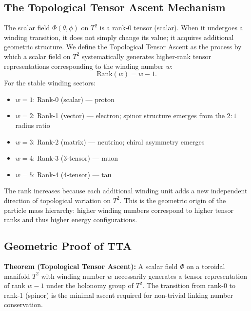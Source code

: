 \documentclass[11pt,a4paper]{article}
\begin{document}
\subsection{The Topological Tensor Ascent Mechanism}
The scalar field \(\Phi (\theta, \phi)\) on \(T^2\) is a rank-0 tensor (scalar). When it undergoes a winding transition, it does not simply change its value; it acquires additional geometric structure. We define the Topological Tensor Ascent as the process by which a scalar field on \(T^2\) systematically generates higher-rank tensor representations corresponding to the winding number \(w\):
\begin{equation}
\mathrm{Rank}(w) = w - 1. \tag{24}
\end{equation}
For the stable winding sectors:
\begin{itemize}
\item \(w = 1\): Rank-0 (scalar) — proton
\item \(w = 2\): Rank-1 (vector) — electron; spinor structure emerges from the \(2:1\) radius ratio
\item \(w = 3\): Rank-2 (matrix) — neutrino; chiral asymmetry emerges
\item \(w = 4\): Rank-3 (3-tensor) — muon
\item \(w = 5\): Rank-4 (4-tensor) — tau
\end{itemize}
The rank increases because each additional winding unit adds a new independent direction of topological variation on \(T^2\). This is the geometric origin of the particle mass hierarchy: higher winding numbers correspond to higher tensor ranks and thus higher energy configurations.

\subsection{Geometric Proof of TTA}
\textbf{Theorem (Topological Tensor Ascent):} A scalar field \(\Phi\) on a toroidal manifold \(T^2\) with winding number \(w\) necessarily generates a tensor representation of rank \(w - 1\) under the holonomy group of \(T^2\). The transition from rank-0 to rank-1 (spinor) is the minimal ascent required for non-trivial linking number conservation.
\end{document}
